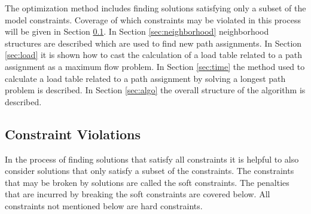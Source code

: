 The optimization method includes finding solutions satisfying only a subset of the model constraints. Coverage of which constraints may be violated in this process will be given in Section \ref{sec:relaxation}.
In Section \ref{sec:neighborhood} neighborhood structures are described which are used to find new path assignments.
In Section \ref{sec:load} it is shown how to cast the calculation of a load table related to a path assignment as a maximum flow problem.
In Section \ref{sec:time} the method used to calculate a load table related to a path assignment by solving a longest path problem is described.
In Section \ref{sec:algo} the overall structure of the algorithm is described.













\subsection{Constraint Violations }
\label{sec:relaxation}

In the process of finding solutions that satisfy all constraints it is helpful to also consider solutions that only satisfy a subset of the constraints.
The constraints that may be broken by solutions are called the soft constraints.
The penalties that are incurred by breaking the soft constraints are covered below.
All constraints not mentioned below are hard constraints. \\


